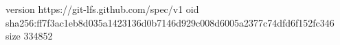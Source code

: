 version https://git-lfs.github.com/spec/v1
oid sha256:ff7f3ac1eb8d035a1423136d0b7146d929c008d6005a2377c74dfd6f152fc346
size 334852
